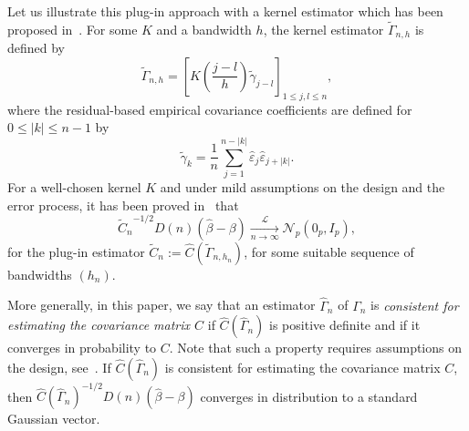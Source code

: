 Let us illustrate this plug-in approach with a kernel estimator
which has been proposed in~\cite{caron2019}. For some $K$ and a bandwidth $h$, the kernel estimator $\widetilde{\Gamma}_{n,h}$ is defined by
\begin{equation}
\widetilde{\Gamma}_{n,h} = \left[ K \left( \frac{j-l}{h} \right) \tilde{\gamma}_{j-l} \right]_{1 \leq j,l \leq n},
\label{Gamma_tapered_star}
\end{equation}
where the residual-based empirical covariance coefficients are defined for $0 \leq | k | \leq n-1$ by
\begin{equation}
\tilde{\gamma}_{k} = \frac{1}{n} \sum_{j=1}^{n-|k|} \hat{\varepsilon}_{j} \hat{\varepsilon}_{j+|k|}.
\label{empcovtilde}
\end{equation}
For a well-chosen kernel $K$ and under mild assumptions on the design and the error process, it has been proved in~\cite{caron2019} that
\begin{equation}
{\widetilde C_n}^{-1/2} D(n)(\hat{\beta} - \beta)  \xrightarrow[n \rightarrow \infty]{\mathcal{L}} \mathcal{N}_p (0_{p}, I_p),
\label{Slut}
\end{equation}
for the plug-in estimator $ \widetilde C_n := \widehat C (\widetilde{\Gamma}_{n,h_n} )$, for some suitable sequence of bandwidths $(h_n)$.

More generally, in this paper, we say that an estimator $\widehat{\Gamma}_{n}$ of $\Gamma_{n}$ is  {\it consistent for estimating the covariance matrix $C$} if
$\widehat C (\widehat{\Gamma}_{n})$ is positive definite and if it converges in probability to $C$. Note that such a property requires assumptions on the design, see~\cite{caron2019}. If $\widehat C (\widehat{\Gamma}_{n})$ is consistent for estimating the covariance  matrix $C$, then $ {\widehat C(\widehat{\Gamma}_n)}^{-1/2} D(n)(\hat{\beta} - \beta)$ converges in distribution to a standard Gaussian vector.

